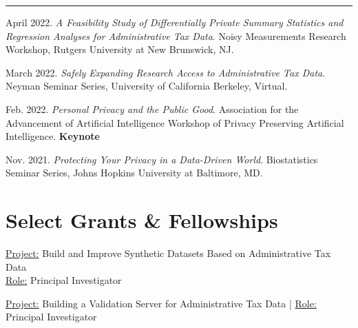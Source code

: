\documentclass[12, letterpaper, roman]{moderncv} %
\begin{document}
\rule{\textwidth}{0.1pt}
\begin{etaremune}[topsep=0pt, itemsep=4pt, partopsep=0pt, parsep=0pt]
\smallskip
    
    \item April 2022. \textit{A Feasibility Study of Differentially Private Summary Statistics and Regression Analyses for Administrative Tax Data}. Noisy Measurements Research Workshop, Rutgers University at New Brunswick, NJ.
    
    \item March 2022. \textit{Safely Expanding Research Access to Administrative Tax Data}. Neyman Seminar Series, University of California Berkeley, Virtual.
    
    \item Feb. 2022. \textit{Personal Privacy and the Public Good}. Association for the Advancement of Artificial Intelligence Workshop of Privacy Preserving Artificial Intelligence. \textbf{Keynote}
    
    \item Nov. 2021. \textit{Protecting Your Privacy in a Data-Driven World}. Biostatistics Seminar Series, Johns Hopkins University at Baltimore, MD.
  
\end{etaremune}

\section{Select Grants \&  Fellowships}

    \vspace{4pt}
    { 
        \underline{Project:} Build and Improve Synthetic Datasets Based on Administrative Tax Data\\
        \underline{Role:} Principal Investigator
    }

    \vspace{4pt}    
    {
        \underline{Project:} Building a Validation Server for Administrative Tax Data | 
        \underline{Role:} Principal Investigator
    }
    
\end{document}

